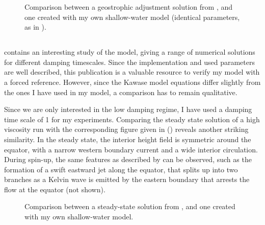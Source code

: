 \begin{figure}
		\hfill%
		\caption[Comparison between a geostrophic adjustment solution from \cite{killworth}, and one created with my own shallow-water model.]{Comparison between a geostrophic adjustment solution from \cite{killworth}, and one created with my own shallow-water model (identical parameters, as in ).}
		\label{fig:killworth-comp}
\end{figure}

\subsection{\cite{greatbatch}}
\cite{greatbatch} contains an interesting study of the \cite{kawase} model, giving a range of numerical solutions for different damping timescales. Since the implementation and used parameters are well described, this publication is a valuable resource to verify my model with a forced reference. However, since the Kawase model equations differ slightly from the ones I have used in my model, a comparison has to remain qualitative.

Since we are only interested in the low damping regime, I have used a damping time scale of \SI{1}{\year} for my experiments. Comparing the steady state solution of a high viscosity run with the corresponding figure given in \cite{greatbatch} () reveals another striking similarity. In the steady state, the interior height field is symmetric around the equator, with a narrow western boundary current and a wide interior circulation. During spin-up, the same features as described by \citeauthor{greatbatch} can be observed, such as the formation of a swift eastward jet along the equator, that splits up into two branches as a Kelvin wave is emitted by the eastern boundary that arrests the flow at the equator (not shown).

\begin{figure}
	\caption{Comparison between a steady-state solution from \cite{greatbatch}, and one created with my own shallow-water model.}
	\label{fig:greatbatch-comp}
\end{figure}
